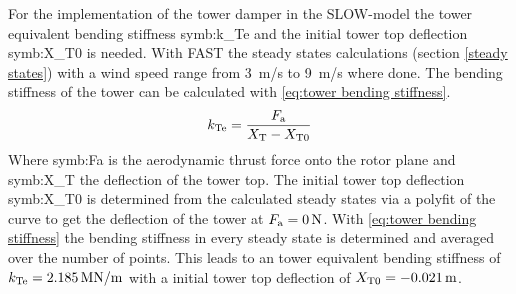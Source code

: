 For the implementation of the tower damper in the \gls{SLOW}-model the tower equivalent bending stiffness \gls{symb:k_Te} and the initial tower top deflection \gls{symb:X_T0} is needed. 
With \gls{FAST} the steady states calculations (section \ref{steady states}) with a wind speed range from \SI{3}{m/s} to \SI{9}{m/s} where done.
The bending stiffness of the tower can be calculated with \ref{eq:tower bending stiffness}.
\begin{equation}
	k_{\textnormal{Te}} = \frac{F_\textnormal{a}}{X_\textnormal{T} - X_{\textnormal{T0}}}
	\label{eq:tower bending stiffness}
\end{equation}
Where \gls{symb:Fa} is the aerodynamic thrust force onto the rotor plane and \gls{symb:X_T} the deflection of the tower top.
The initial tower top deflection \gls{symb:X_T0} is determined from the calculated steady states via a polyfit of the curve to get the deflection of the tower at $F_\textnormal{a} = \SI{0}{N}$.
With \ref{eq:tower bending stiffness} the bending stiffness in every steady state is determined and averaged over the number of points. 
This leads to an tower equivalent bending stiffness of $k_\textnormal{Te} = \SI{2.185}{\mega \newton /\meter}$ with a initial tower top deflection of $X_\textnormal{T0} = \SI{-0.021}{m}$.
